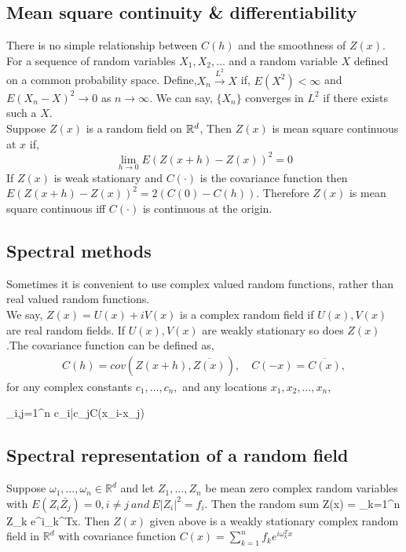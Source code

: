 \subsection{Mean square continuity \& differentiability}

There is no simple relationship between $C(h)$ and the smoothness of $Z(x)$. For a sequence of random variables $X_1, X_2,\ldots$ and a random variable $X$ defined on a common probability space. Define,$X_n\overset{L^2}\to X$ if, $E(X^2)<\infty$ and $E(X_n - X)^2\to 0$ as $n \rightarrow \infty$. We can say, $\{X_n\}$ converges in $L^2$ if there exists such a $X$.\\

Suppose $Z(x)$ is a random field on $\mathbb{R}^d$, Then $Z(x)$ is mean square continuous at $x$ if, $$\lim_{h\to 0} E(Z(x+h)-Z(x))^2 =0$$
If $Z(x)$ is weak stationary and $C(\cdot)$ is the covariance function then $E(Z(x+h)-Z(x))^2=2(C(0)-C(h))$. Therefore $Z(x)$ is mean square continuous iff $C(\cdot)$ is continuous at the origin.

\subsection{Spectral methods} 

Sometimes it is convenient to use complex valued random functions, rather than real valued random functions. \\

We say, $Z(x)=U(x) + i V(x)$ is a complex random field if $U(x),V(x)$ are real random fields. If $U(x),V(x)$ are weakly stationary so does $Z(x)$.The covariance function can be defined as,
\begin{eqnarray*}
	C(h) = cov(Z(x+h), \overline{Z(x)}), \quad C(-x)=\overline{C(x)},
\end{eqnarray*}
for any complex constants $c_1,\ldots, c_n,$ and any locations $x_1, x_2, \ldots, x_n$,

\beq \sum_{i,j=1}^n c_i\bar{c_j}C(x_i-x_j)\eeq

\subsection{Spectral representation of a random field}

Suppose $\omega_1,\ldots, \omega_n \in \mathbb{R}^d$ and let $Z_1, \ldots, Z_n$ be mean zero complex random variables with  $E(Z_i\bar{Z_j})=0, i\ne j\ and\ E|Z_i|^2=f_i$. Then the random sum
\beq Z(x) = \sum_{k=1}^n Z_k e^{i\omega_k^Tx}.\eeq
Then $Z(x)$ given above is a weakly stationary complex random field in $\mathbb{R}^d$ with covariance function $C(x) = \sum_{k=1}^n f_k e^{i\omega_k^Tx}$\\

